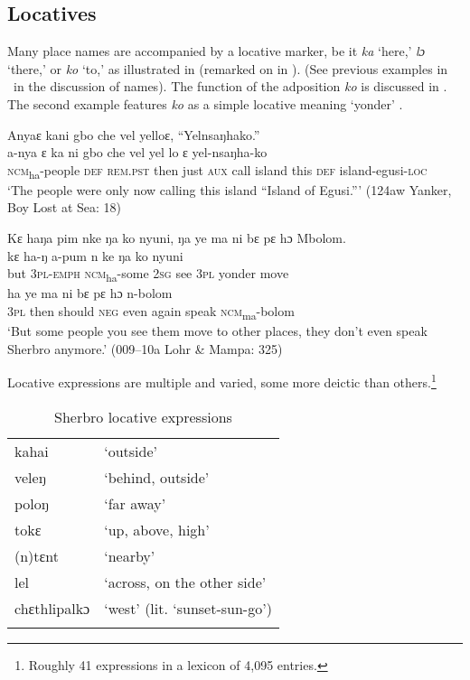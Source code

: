 \subsection{Locatives}\label{sec:3.10.2}
\hypertarget{Toc115517776}{}
Many place names are accompanied by a locative marker, be it \textit{ka} ‘here,' \textit{lɔ} ‘there,' or \textit{ko} ‘to,' as illustrated in  (remarked on in \citealt{Hanson1979a}). (See previous examples in \ in the discussion of names). The function of the adposition \textit{ko} is discussed in . The second example features \textit{ko} as a simple locative meaning ‘yonder' .

\ea%
    \label{ex:98}
    \ea \label{ex:98a} Anyaɛ kani gbo che vel yelloɛ, “Yelnsaŋhako.”\\
	\gll a-nya        ɛ  ka      ni    gbo  che  vel  yel    lo    ɛ   yel-nsaŋha-ko\\
	\textsc{ncm}\textsubscript{ha}{}-people \textsc{def}  \textsc{rem.pst}  then  just  \textsc{aux}  call  island    this  \textsc{def} island-egusi-\textsc{loc}\\
	\glt ‘The people were only now calling this island “Island of Egusi.”' (124aw Yanker, Boy Lost at Sea: 18)

	\ex \label{ex:98b} Kɛ haŋa pim nke ŋa ko nyuni, ŋa ye ma ni bɛ pɛ hɔ Mbolom.\\
	\gll kɛ    ha-ŋ      a-pum      n    ke    ŋa    ko      nyuni\\
	but    \textsc{3pl-emph}  \textsc{ncm}\textsubscript{ha}{}-some  \textsc{2sg}  see  \textsc{3pl}  yonder  move\\
	\gll ha    ye    ma    ni    bɛ    pɛ      hɔ      n-bolom\\
	\textsc{3pl}    then  should  \textsc{neg}  even  again    speak    \textsc{ncm}\textsubscript{ma}{}-bolom\\
	\glt ‘But some people you see them move to other places, they don't even speak Sherbro anymore.' (009--10a Lohr \& Mampa: 325)\\
\z
\z

Locative expressions are multiple and varied, some more deictic than others.\footnote{Roughly 41 expressions in a lexicon of 4,095 entries.}

\begin{table}
\caption{\label{tab:wordcat:21}Sherbro locative expressions}


\begin{tabular}{ll}
\lsptoprule
kahai & ‘outside'\\
veleŋ & ‘behind, outside'\\
poloŋ & ‘far away'\\
tokɛ & ‘up, above, high'\\
(n)tɛnt & ‘nearby'\\
lel & ‘across, on the other side'\\
chɛthlipalkɔ & ‘west' (lit. ‘sunset-sun-go')\\
\lspbottomrule
\end{tabular}
\end{table}

